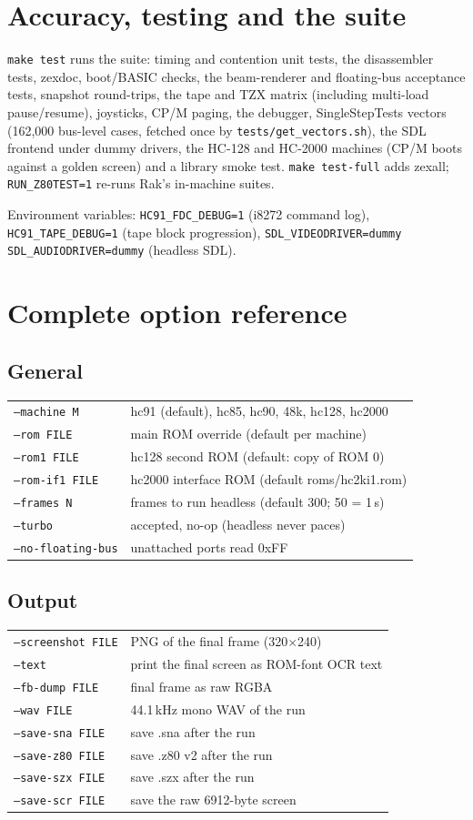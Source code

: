 \documentclass[11pt,a4paper]{article}
\newcommand{\opt}[1]{\texttt{#1}}
\begin{document}
\section{Accuracy, testing and the suite}

\texttt{make test} runs the suite: timing and contention unit tests,
the disassembler tests, zexdoc, boot/BASIC checks, the beam-renderer
and floating-bus acceptance tests, snapshot round-trips, the tape and
TZX matrix (including multi-load pause/resume), joysticks, CP/M
paging, the debugger, SingleStepTests vectors (162{,}000 bus-level
cases, fetched once by \texttt{tests/get\_vectors.sh}), the SDL
frontend under dummy drivers, the HC-128 and HC-2000 machines (CP/M
boots against a golden screen) and a library smoke test.
\texttt{make test-full} adds zexall; \texttt{RUN\_Z80TEST=1} re-runs
Rak's in-machine suites.

Environment variables: \texttt{HC91\_FDC\_DEBUG=1} (i8272 command
log), \texttt{HC91\_TAPE\_DEBUG=1} (tape block progression),
\texttt{SDL\_VIDEODRIVER=dummy SDL\_AUDIODRIVER=dummy} (headless SDL).

\section{Complete option reference}

\newcommand{\optrow}[2]{\opt{#1} & #2 \\}
\subsection*{General}
\begin{tabularx}{\textwidth}{p{4.6cm}X}
\toprule
\optrow{--machine M}{hc91 (default), hc85, hc90, 48k, hc128, hc2000}
\optrow{--rom FILE}{main ROM override (default per machine)}
\optrow{--rom1 FILE}{hc128 second ROM (default: copy of ROM 0)}
\optrow{--rom-if1 FILE}{hc2000 interface ROM (default roms/hc2ki1.rom)}
\optrow{--frames N}{frames to run headless (default 300; 50 = 1\,s)}
\optrow{--turbo}{accepted, no-op (headless never paces)}
\optrow{--no-floating-bus}{unattached ports read 0xFF}
\bottomrule
\end{tabularx}

\subsection*{Output}
\begin{tabularx}{\textwidth}{p{4.6cm}X}
\toprule
\optrow{--screenshot FILE}{PNG of the final frame (320$\times$240)}
\optrow{--text}{print the final screen as ROM-font OCR text}
\optrow{--fb-dump FILE}{final frame as raw RGBA}
\optrow{--wav FILE}{44.1\,kHz mono WAV of the run}
\optrow{--save-sna FILE}{save .sna after the run}
\optrow{--save-z80 FILE}{save .z80 v2 after the run}
\optrow{--save-szx FILE}{save .szx after the run}
\optrow{--save-scr FILE}{save the raw 6912-byte screen}
\bottomrule
\end{tabularx}
\end{document}
